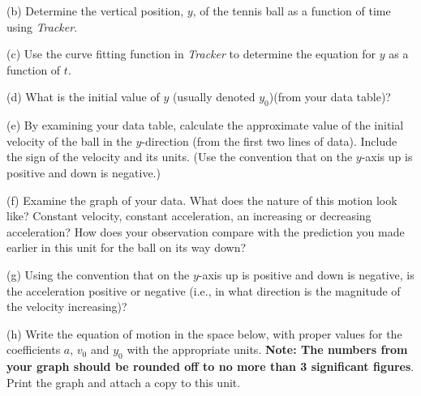 (b) Determine the vertical position, $y$, of the tennis ball as a function of time using \textit{Tracker}. 

(c) Use the curve fitting function in \textit{Tracker} to determine the equation for $y$ as a function 
of $t$.

(d) What is the initial value of $y$ (usually denoted \( y_{0} \))(from your data table)? 
\vspace{10mm}

(e) By examining your data table, calculate the approximate value of the initial velocity of the ball in the $y$-direction (from the first two lines of data). Include the sign of the velocity and its units. (Use the convention that on the $y$-axis up is positive and down is negative.)
\vspace{20mm}

(f) Examine the graph of your data. What does the nature of this motion look
like? Constant velocity, constant acceleration, an increasing or decreasing
acceleration? How does your observation compare with the prediction you made
earlier in this unit for the ball on its way down?
\vspace{20mm}

(g) Using the convention that on the $y$-axis up is positive and down is negative, is the acceleration positive or negative (i.e., in what direction is the magnitude of the velocity increasing)?
\vspace{20mm}

(h) Write the equation of motion in the space below, with proper values for the coefficients 
$a$, \( v_{0} \) and \( y_{0} \) with the appropriate units. \textbf{Note: The numbers from 
your graph should be rounded off to no more than 3 significant figures}. Print the graph and 
attach a copy to this unit. 

